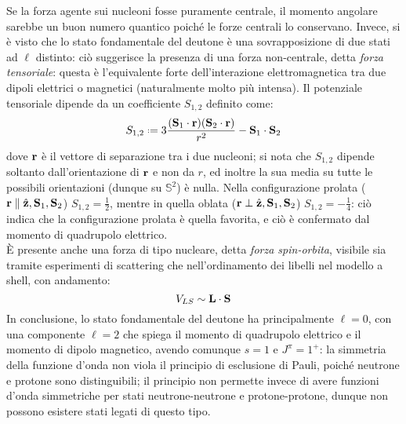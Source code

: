 Se la forza agente sui nucleoni fosse puramente centrale, il momento angolare sarebbe un buon numero quantico poiché le forze centrali lo conservano. Invece, si è visto che lo stato fondamentale del deutone è una sovrapposizione di due stati ad $ \ell $ distinto: ciò suggerisce la presenza di una forza non-centrale, detta \textit{forza tensoriale}: questa è l'equivalente forte dell'interazione elettromagnetica tra due dipoli elettrici o magnetici (naturalmente molto più intensa). Il potenziale tensoriale dipende da un coefficiente $ S_{1,2} $ definito come:
\begin{equation}
	S_{1,2} \defeq 3 \frac{(\ve{S}_1 \cdot \ve{r}) (\ve{S}_2 \cdot \ve{r})}{r^2} - \ve{S}_1 \cdot \ve{S}_2
	\label{eq:4.19}
\end{equation}
dove $ \mathbf{r} $ è il vettore di separazione tra i due nucleoni; si nota che $ S_{1,2} $ dipende soltanto dall'orientazione di $ \mathbf{r} $ e non da $ r $, ed inoltre la sua media su tutte le possibili orientazioni (dunque su $ \mathbb{S}^2 $) è nulla. Nella configurazione prolata ($ \mathbf{r} \parallel \hat{\mathbf{z}},\mathbf{S}_1,\mathbf{S}_2 $) $ S_{1,2} = \frac{1}{2} $, mentre in quella oblata ($ \mathbf{r} \perp \hat{\mathbf{z}},\mathbf{S}_1,\mathbf{S}_2 $) $ S_{1,2} = - \frac{1}{4} $: ciò indica che la configurazione prolata è quella favorita, e ciò è confermato dal momento di quadrupolo elettrico.\\
È presente anche una forza di tipo nucleare, detta \textit{forza spin-orbita}, visibile sia tramite esperimenti di scattering che nell'ordinamento dei libelli nel modello a shell, con andamento:
\begin{equation}
	V_{LS} \sim \mathbf{L} \cdot \mathbf{S}
	\label{eq:4.20}
\end{equation}
In conclusione, lo stato fondamentale del deutone ha principalmente $ \ell = 0 $, con una componente $ \ell = 2 $ che spiega il momento di quadrupolo elettrico e il momento di dipolo magnetico, avendo comunque $ s = 1 $ e $ J^{\pi} = 1^+ $: la simmetria della funzione d'onda non viola il principio di esclusione di Pauli, poiché neutrone e protone sono distinguibili; il principio non permette invece di avere funzioni d'onda simmetriche per stati neutrone-neutrone e protone-protone, dunque non possono esistere stati legati di questo tipo.










